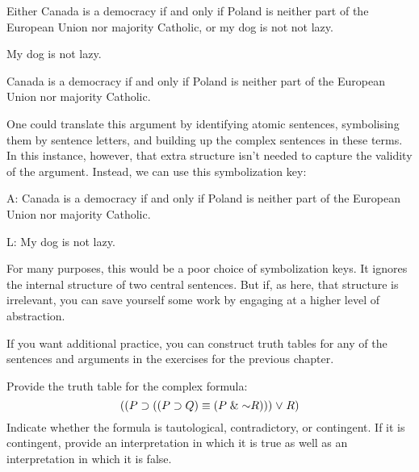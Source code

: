 \begin{earg}
  \item Either Canada is a democracy if and only if Poland is neither part of the European Union nor majority Catholic, or my dog is not not lazy.
  \item My dog is not lazy.
  \item[\therefore] Canada is a democracy if and only if Poland is neither part of the European Union nor majority Catholic.
\end{earg}

One could translate this argument by identifying atomic sentences, symbolising them by sentence letters, and building up the complex sentences in these terms.
In this instance, however, that extra structure isn't needed to capture the validity of the argument.
Instead, we can use this symbolization key:

\begin{ekey}
\item[A:] Canada is a democracy if and only if Poland is neither part of the European Union nor majority Catholic.
\item[L:] My dog is not lazy.
\end{ekey}

For many purposes, this would be a poor choice of symbolization keys.
It ignores the internal structure of two central sentences.
But if, as here, that structure is irrelevant, you can save yourself some work by engaging at a higher level of abstraction.




\iffalse

\practiceproblems
If you want additional practice, you can construct truth tables for any of the sentences and arguments in the exercises for the previous chapter.



\problempart
\label{HW2.E}
Provide the truth table for the complex formula:
$$((P \eif (( P \eif Q) \eiff (P \eand \enot R))) \eor R)$$
Indicate whether the formula is tautological, contradictory, or contingent.
If it is contingent, provide an interpretation in which it is true as well as an interpretation in which it is false.


